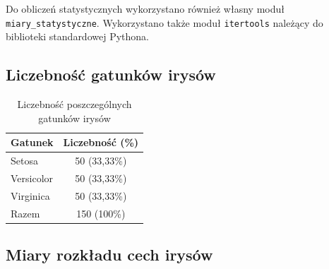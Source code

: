 \documentclass[12pt,a4paper]{article}
\begin{document}
Do obliczeń statystycznych wykorzystano również
własny moduł \texttt{miary\_statystyczne}.
Wykorzystano także moduł \texttt{itertools}
należący do biblioteki standardowej Pythona.


\subsection{Liczebność gatunków irysów}

\begin{table}[!htbp]
    \centering
    \caption{Liczebność poszczególnych gatunków irysów}
    \label{tab:wyniki}

    \begin{tabular}{|l|c|}
        \hline
        Gatunek & Liczebność (\%) \\
        \hline
        Setosa & 50 (33,33\%) \\
        Versicolor & 50 (33,33\%) \\
        Virginica & 50 (33,33\%) \\
        \hline
        Razem & 150 (100\%) \\
        \hline
    \end{tabular}
\end{table}


\subsection{Miary rozkładu cech irysów}

\begin{table}[!htbp]
    \centering
    \caption{Miary rozkładu dla cech irysów}
    \label{tab:miary}

\end{table}
\end{document}
